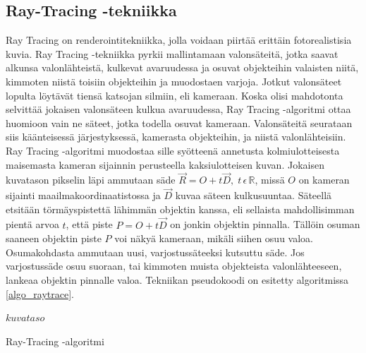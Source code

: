 \documentclass[a4paper,12pt, titlepage]{article}
\theoremstyle{break}
\newcommand{\R}{\mathbb{R}}
\begin{document}
\subsection{Ray-Tracing -tekniikka}

Ray Tracing on renderointitekniikka, jolla voidaan piirtää erittäin fotorealistisia kuvia. Ray Tracing -tekniikka pyrkii mallintamaan valonsäteitä, jotka saavat alkunsa valonlähteistä, kulkevat avaruudessa ja osuvat objekteihin valaisten niitä, kimmoten niistä toisiin objekteihin ja muodostaen varjoja. Jotkut valonsäteet lopulta löytävät tiensä katsojan silmiin, eli kameraan. Koska olisi mahdotonta selvittää jokaisen valonsäteen kulkua avaruudessa, Ray Tracing -algoritmi ottaa huomioon vain ne säteet, jotka todella osuvat kameraan. Valonsäteitä seurataan siis käänteisessä järjestyksessä, kamerasta objekteihin, ja niistä valonlähteisiin.\cite{janke}\\

Ray Tracing -algoritmi muodostaa sille syötteenä annetusta kolmiulotteisesta maisemasta kameran sijainnin perusteella kaksiulotteisen kuvan. Jokaisen kuvatason pikselin läpi ammutaan säde $\vec{R}=O+t\vec{D},\;t\,\epsilon\,\R$, missä $O$ on kameran sijainti maailmakoordinaatistossa ja $\vec{D}$ kuvaa säteen kulkusuuntaa. Säteellä etsitään törmäyspistettä lähimmän objektin kanssa, eli sellaista mahdollisimman pientä arvoa $t$, että piste $P=O+t\vec{D}$ on jonkin objektin pinnalla. Tällöin osuman saaneen objektin piste $P$ voi näkyä kameraan, mikäli siihen osuu valoa. Osumakohdasta ammutaan uusi, varjostussäteeksi kutsuttu säde. Jos varjostussäde osuu suoraan, tai kimmoten muista objekteista valonlähteeseen, lankeaa objektin pinnalle valoa. Tekniikan pseudokoodi on esitetty algoritmissa \ref{algo_raytrace}.\cite{janke}\\

\begin{algorithm}
\KwRet $kuvataso$
\caption{Ray-Tracing -algoritmi}\label{algo_raytrace}
\end{algorithm}
\end{document}
